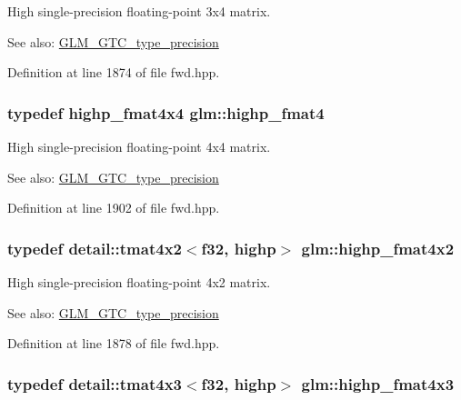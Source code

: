 High single-precision floating-point 3x4 matrix. \begin{Desc}
\item[See also:]\hyperlink{group__gtc__type__precision}{GLM\_\-GTC\_\-type\_\-precision} \end{Desc}


Definition at line 1874 of file fwd.hpp.\hypertarget{group__gtc__type__precision_g4c7c9823ade7c29e29b5a313949ae502}{
\subsubsection[highp\_\-fmat4]{\setlength{\rightskip}{0pt plus 5cm}typedef highp\_\-fmat4x4 {\bf glm::highp\_\-fmat4}}}
\label{group__gtc__type__precision_g4c7c9823ade7c29e29b5a313949ae502}


High single-precision floating-point 4x4 matrix. \begin{Desc}
\item[See also:]\hyperlink{group__gtc__type__precision}{GLM\_\-GTC\_\-type\_\-precision} \end{Desc}


Definition at line 1902 of file fwd.hpp.\hypertarget{group__gtc__type__precision_gb3d688f05a884be93c647bce2d8a46f4}{
\subsubsection[highp\_\-fmat4x2]{\setlength{\rightskip}{0pt plus 5cm}typedef detail::tmat4x2$<$f32, highp$>$ {\bf glm::highp\_\-fmat4x2}}}
\label{group__gtc__type__precision_gb3d688f05a884be93c647bce2d8a46f4}


High single-precision floating-point 4x2 matrix. \begin{Desc}
\item[See also:]\hyperlink{group__gtc__type__precision}{GLM\_\-GTC\_\-type\_\-precision} \end{Desc}


Definition at line 1878 of file fwd.hpp.\hypertarget{group__gtc__type__precision_g07f7578fc5a4dd8cdd8a532db25d535f}{
\subsubsection[highp\_\-fmat4x3]{\setlength{\rightskip}{0pt plus 5cm}typedef detail::tmat4x3$<$f32, highp$>$ {\bf glm::highp\_\-fmat4x3}}}
\label{group__gtc__type__precision_g07f7578fc5a4dd8cdd8a532db25d535f}


